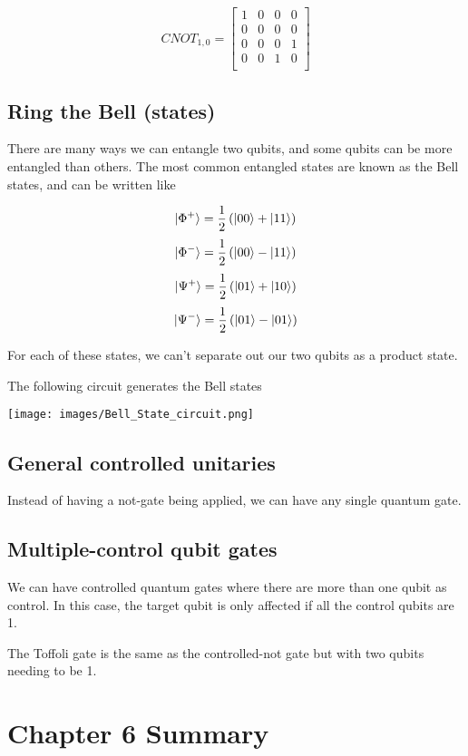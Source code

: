 \documentclass{book}
\begin{document}
$$
CNOT_{1, 0} = \begin{bmatrix} 1 & 0 & 0 & 0 \\
0 & 0 & 0 & 0 \\
0 & 0 & 0 & 1 \\
0 & 0 & 1 & 0 \\
\end{bmatrix}
$$


\subsection{ Ring the Bell (states)}


There are many ways we can entangle two qubits, and some qubits can be more entangled than others. The most common entangled states are known as the Bell states, and can be written like

$$ \ket{\Phi^+} = \frac{1}{2} \left( \ket{00} + \ket{11} \right) $$
$$ \ket{\Phi^-} = \frac{1}{2} \left( \ket{00} - \ket{11} \right) $$
$$ \ket{\Psi^+} = \frac{1}{2} \left( \ket{01} + \ket{10} \right) $$
$$ \ket{\Psi^-} = \frac{1}{2} \left( \ket{01} - \ket{01} \right) $$

For each of these states, we can't separate out our two qubits as a product state. 


The following circuit generates the Bell states

\texttt{[image: images/Bell\_State\_circuit.png]}


\subsection{General controlled unitaries }

Instead of having a not-gate being applied, we can have any single quantum gate. 

\subsection{Multiple-control qubit gates }

We can have controlled quantum gates where there are more than one qubit as control. In this case, the target qubit is only affected if all the control qubits are 1. 

The Toffoli gate is the same as the controlled-not gate but with two qubits needing to be 1.

\section{Chapter 6 Summary}
\end{document}
